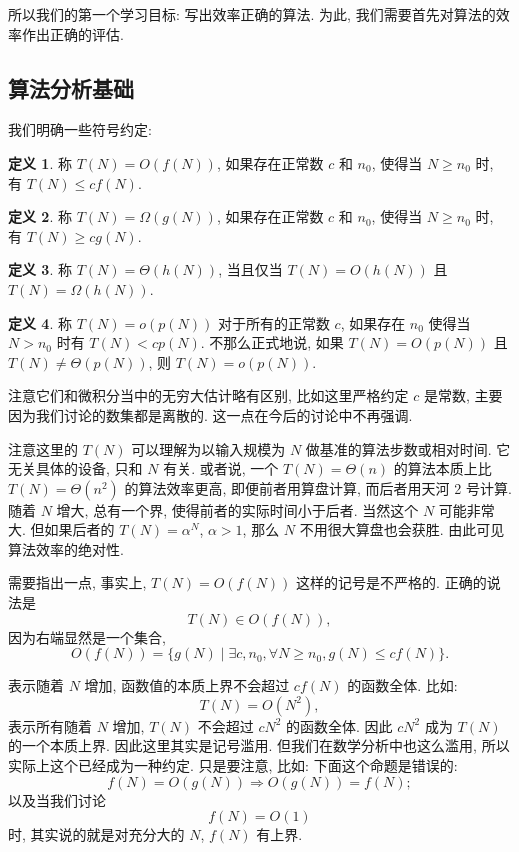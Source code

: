 \documentclass[a4paper]{ctexart}
\theoremstyle{definition}
\newtheorem{definition}{定义}[section]
\theoremstyle{definition}
\begin{document}
所以我们的第一个学习目标: 写出效率正确的算法. 为此, 我们需要首先对算法的效率作出正确的评估. 

\subsection{算法分析基础}

我们明确一些符号约定:

\begin{definition}
  称 $T(N) = O(f(N))$, 如果存在正常数 $c$ 和 $n_0$,
  使得当 $N \geq n_0$ 时, 有 $T(N) \leq cf(N)$.
\end{definition}

\begin{definition}
  称 $T(N) = \Omega(g(N))$, 如果存在正常数 $c$ 和 $n_0$,
  使得当 $N \geq n_0$ 时, 有 $T(N) \geq cg(N)$.  
\end{definition}

\begin{definition}
称 $T(N) = \Theta(h(N))$, 当且仅当 $T(N) = O(h(N))$ 且 $T(N) = \Omega(h(N))$.  
\end{definition}

\begin{definition}
  称 $T(N) = o(p(N))$ 对于所有的正常数 $c$,
  如果存在 $n_0$ 使得当 $N > n_0$ 时有 $T(N) < cp(N)$.
  不那么正式地说, 如果 $T(N) = O(p(N))$ 且 $T(N) \neq \Theta(p(N))$,
  则 $T(N) = o(p(N))$.
\end{definition}

注意它们和微积分当中的无穷大估计略有区别, 比如这里严格约定 $c$ 是常数,
主要因为我们讨论的数集都是离散的. 这一点在今后的讨论中不再强调.

注意这里的 $T(N)$ 可以理解为以输入规模为 $N$ 做基准的算法步数或相对时间.
它无关具体的设备, 只和 $N$ 有关. 或者说,
一个 $T(N) = \Theta(n)$ 的算法本质上比 $T(N) = \Theta(n^2)$ 的算法效率更高,
即便前者用算盘计算, 而后者用天河 2 号计算. 随着 $N$ 增大, 总有一个界,
使得前者的实际时间小于后者. 当然这个 $N$ 可能非常大. 但如果后者的
$T(N) = \alpha^N$, $\alpha > 1$, 那么 $N$ 不用很大算盘也会获胜.
由此可见算法效率的绝对性.

需要指出一点, 事实上, $T(N) = O(f(N))$ 这样的记号是不严格的.
正确的说法是
$$
T(N) \in O(f(N)),
$$
因为右端显然是一个集合, 
$$
O(f(N)) = \{ g(N) \mid \exists c, n_0, \forall N \geq n_0, g(N) \leq cf(N) \}.
$$

表示随着 $N$ 增加, 函数值的本质上界不会超过 $c f(N)$ 的函数全体.
比如:
$$
T(N) = O(N^2),
$$
表示所有随着 $N$ 增加, $T(N)$ 不会超过 $c N^2$ 的函数全体.
因此 $c N^2$ 成为 $T(N)$ 的一个本质上界. 因此这里其实是记号滥用. 
但我们在数学分析中也这么滥用, 所以实际上这个已经成为一种约定. 只是要注意, 比如: 
下面这个命题是错误的:
$$
f(N) = O(g(N)) \Rightarrow O(g(N)) = f(N); 
$$
以及当我们讨论
$$
f(N) = O(1)
$$
时, 其实说的就是对充分大的 $N$, $f(N)$ 有上界. 
\end{document}
